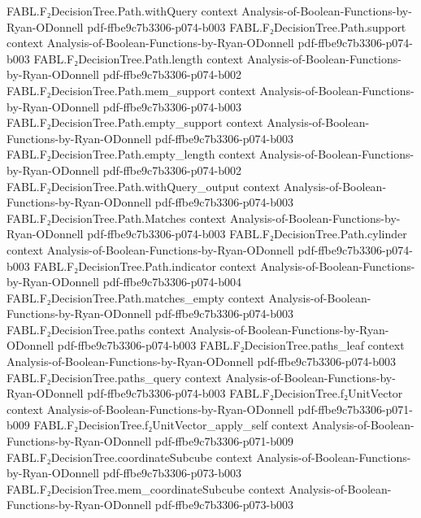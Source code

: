 \begin{theorem}
  {FABL.F₂DecisionTree.Path.withQuery}
  {context}
  {Analysis-of-Boolean-Functions-by-Ryan-ODonnell}
  {pdf-ffbe9c7b3306-p074-b003}
\proofstep
  {FABL.F₂DecisionTree.Path.support}
  {context}
  {Analysis-of-Boolean-Functions-by-Ryan-ODonnell}
  {pdf-ffbe9c7b3306-p074-b003}
\proofstep
  {FABL.F₂DecisionTree.Path.length}
  {context}
  {Analysis-of-Boolean-Functions-by-Ryan-ODonnell}
  {pdf-ffbe9c7b3306-p074-b002}
\proofstep
  {FABL.F₂DecisionTree.Path.mem_support}
  {context}
  {Analysis-of-Boolean-Functions-by-Ryan-ODonnell}
  {pdf-ffbe9c7b3306-p074-b003}
\proofstep
  {FABL.F₂DecisionTree.Path.empty_support}
  {context}
  {Analysis-of-Boolean-Functions-by-Ryan-ODonnell}
  {pdf-ffbe9c7b3306-p074-b003}
\proofstep
  {FABL.F₂DecisionTree.Path.empty_length}
  {context}
  {Analysis-of-Boolean-Functions-by-Ryan-ODonnell}
  {pdf-ffbe9c7b3306-p074-b002}
\proofstep
  {FABL.F₂DecisionTree.Path.withQuery_output}
  {context}
  {Analysis-of-Boolean-Functions-by-Ryan-ODonnell}
  {pdf-ffbe9c7b3306-p074-b003}
\proofstep
  {FABL.F₂DecisionTree.Path.Matches}
  {context}
  {Analysis-of-Boolean-Functions-by-Ryan-ODonnell}
  {pdf-ffbe9c7b3306-p074-b003}
\proofstep
  {FABL.F₂DecisionTree.Path.cylinder}
  {context}
  {Analysis-of-Boolean-Functions-by-Ryan-ODonnell}
  {pdf-ffbe9c7b3306-p074-b003}
\proofstep
  {FABL.F₂DecisionTree.Path.indicator}
  {context}
  {Analysis-of-Boolean-Functions-by-Ryan-ODonnell}
  {pdf-ffbe9c7b3306-p074-b004}
\proofstep
  {FABL.F₂DecisionTree.Path.matches_empty}
  {context}
  {Analysis-of-Boolean-Functions-by-Ryan-ODonnell}
  {pdf-ffbe9c7b3306-p074-b003}
\proofstep
  {FABL.F₂DecisionTree.paths}
  {context}
  {Analysis-of-Boolean-Functions-by-Ryan-ODonnell}
  {pdf-ffbe9c7b3306-p074-b003}
\proofstep
  {FABL.F₂DecisionTree.paths_leaf}
  {context}
  {Analysis-of-Boolean-Functions-by-Ryan-ODonnell}
  {pdf-ffbe9c7b3306-p074-b003}
\proofstep
  {FABL.F₂DecisionTree.paths_query}
  {context}
  {Analysis-of-Boolean-Functions-by-Ryan-ODonnell}
  {pdf-ffbe9c7b3306-p074-b003}
\proofstep
  {FABL.F₂DecisionTree.f₂UnitVector}
  {context}
  {Analysis-of-Boolean-Functions-by-Ryan-ODonnell}
  {pdf-ffbe9c7b3306-p071-b009}
\proofstep
  {FABL.F₂DecisionTree.f₂UnitVector_apply_self}
  {context}
  {Analysis-of-Boolean-Functions-by-Ryan-ODonnell}
  {pdf-ffbe9c7b3306-p071-b009}
\proofstep
  {FABL.F₂DecisionTree.coordinateSubcube}
  {context}
  {Analysis-of-Boolean-Functions-by-Ryan-ODonnell}
  {pdf-ffbe9c7b3306-p073-b003}
\proofstep
  {FABL.F₂DecisionTree.mem_coordinateSubcube}
  {context}
  {Analysis-of-Boolean-Functions-by-Ryan-ODonnell}
  {pdf-ffbe9c7b3306-p073-b003}
\proofstep

\end{theorem}
